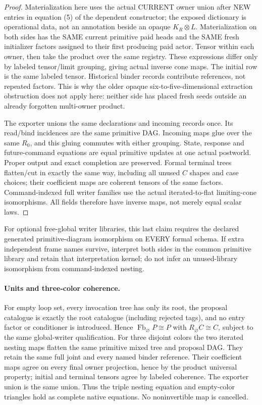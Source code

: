 \documentclass[11pt]{article}
\begin{document}
\begin{proof}
Materialization here uses the actual CURRENT owner union after NEW entries in equation (5) of the dependent constructor; the exposed dictionary is operational data, not an annotation beside an opaque $K_R\otimes L$. Materialization on both sides has the SAME current primitive paid heads and the SAME fresh initializer factors assigned to their first producing paid actor. Tensor within each owner, then take the product over the same registry. These expressions differ only by labeled tensor/limit grouping, giving actual inverse cone maps. The initial row is the same labeled tensor. Historical binder records contribute references, not repeated factors. This is why the older opaque six-to-five-dimensional extraction obstruction does not apply here: neither side has placed fresh seeds outside an already forgotten multi-owner product.

The exporter unions the same declarations and incoming records once. Its read/bind incidences are the same primitive DAG. Incoming maps glue over the same $R_0$, and this gluing commutes with either grouping. State, response and future-command equations are equal primitive updates at one actual postworld. Proper output and exact completion are preserved. Formal terminal trees flatten/cut in exactly the same way, including all unused $C$ shapes and case choices; their coefficient maps are coherent tensors of the same factors. Command-indexed full writer families use the actual iterated-to-flat limiting-cone isomorphisms. All fields therefore have inverse maps, not merely equal scalar laws.
\end{proof}

For optional free-global writer libraries, this last claim requires the declared generated primitive-diagram isomorphism on EVERY formal schema. If extra independent frame names survive, interpret both sides in the common primitive library and retain that interpretation kernel; do not infer an unused-library isomorphism from command-indexed nesting.

\paragraph{Units and three-color coherence.}
For empty loop set, every invocation tree has only its root, the proposal catalogue is exactly the root catalogue (including rejected tags), and no entry factor or conditioner is introduced. Hence $\operatorname{Fb}_{\varnothing}P\cong P$ with $R_{\varnothing}C\cong C$, subject to the same global-writer qualification. For three disjoint colors the two iterated nesting maps flatten the same primitive mixed tree and proposal DAG. They retain the same full joint and every named binder reference. Their coefficient maps agree on every final owner projection, hence by the product universal property; initial and terminal tensors agree by labeled coherence. The exporter union is the same union. Thus the triple nesting equation and empty-color triangles hold as complete native equations. No noninvertible map is cancelled.
\end{document}
